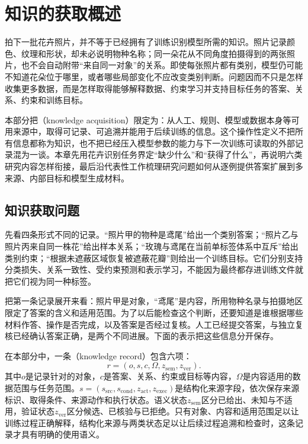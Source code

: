 \chapter{知识的获取概述}
\label{chap:knowledge-acquisition-overview}

拍下一批花卉照片，并不等于已经拥有了训练识别模型所需的知识。照片记录颜色、纹理和形状，却未必说明物种名称；同一朵花从不同角度拍摄得到的两张照片，也不会自动附带“来自同一对象”的关系。即使每张照片都有类别，模型仍可能不知道花朵位于哪里，或者哪些局部变化不应改变类别判断。问题因而不只是怎样收集更多数据，而是怎样取得能够解释数据、约束学习并支持目标任务的答案、关系、约束和训练目标。

本部分把（knowledge acquisition）限定为：从人工、规则、模型或数据本身等可用来源中，取得可记录、可追溯并能用于后续训练的信息。这个操作性定义不把所有信息都称为知识，也不把已经压入模型参数的能力与下一次训练可读取的外部记录混为一谈。本章先用花卉识别任务界定“缺少什么”和“获得了什么”，再说明六类研究内容怎样衔接，最后沿代表性工作梳理研究问题如何从逐例提供答案扩展到多来源、内部目标和模型生成材料。

\section{知识获取问题}
\label{sec:knowledge-acquisition-problem}

先看四条形式不同的记录。“照片甲的物种是鸢尾”给出一个类别答案；“照片乙与照片丙来自同一株花”给出样本关系；“玫瑰与鸢尾在当前单标签体系中互斥”给出类别约束；“根据未遮蔽区域恢复被遮蔽花瓣”则给出一个训练目标。它们分别支持分类损失、关系一致性、受约束预测和表示学习，不能因为最终都存进训练文件就把它们视为同一种标签。

把第一条记录展开来看：照片甲是对象，“鸢尾”是内容，所用物种名录与拍摄地区限定了答案的含义和适用范围。为了以后能检查这个判断，还要知道是谁根据哪些材料作答、操作是否完成，以及答案是否经过复核。人工已经提交答案，与独立复核已经确认答案正确，是两个不同进展。下面的表示把这些信息分开保存。

\begin{definition}[知识记录]
  \label{def:knowledge-acquisition-record}
  在本部分中，一条（knowledge record）包含六项：
  \[
    r=(o,s,c,\Omega,z_{\mathrm{sem}},z_{\mathrm{ver}}).
  \]
  其中$o$是记录针对的对象，$c$是答案、关系、约束或目标等内容，$\Omega$是内容适用的数据范围与任务范围。$s=(s_{\mathrm{src}},s_{\mathrm{cond}},z_{\mathrm{act}},z_{\mathrm{exec}})$是结构化来源字段，依次保存来源标识、取得条件、来源动作和执行状态。语义状态$z_{\mathrm{sem}}$区分已给出、未知与不适用，验证状态$z_{\mathrm{ver}}$区分候选、已核验与已拒绝。只有对象、内容和适用范围足以让训练过程正确解释，结构化来源与两类状态足以让后续过程追溯和检查时，这条记录才具有明确的使用语义。
\end{definition}

